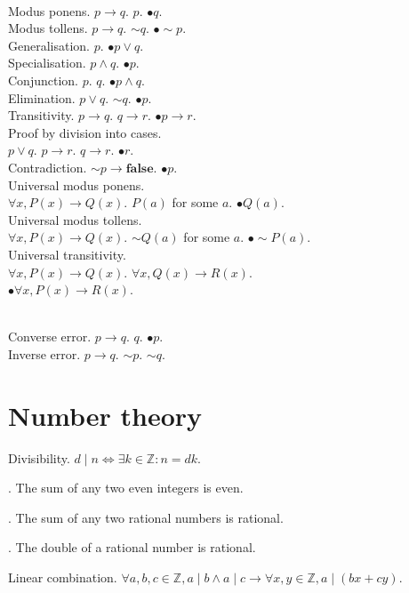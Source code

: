 \documentclass{slnotes}
\newcommand{\slnot}{\mathop{\sim}}
\begin{document}
\\
Modus ponens. \(p \to q\). \(p\). \(\bullet q\).\\
Modus tollens. \(p \to q\). \(\slnot q\). \(\bullet \slnot p\).\\
Generalisation. \(p\). \(\bullet p \lor q\).\\
Specialisation. \(p \land q\). \(\bullet p\).\\
Conjunction. \(p\). \(q\). \(\bullet p \land q\).\\
Elimination. \(p \lor q\). \(\slnot q\). \(\bullet p\).\\
Transitivity. \(p \to q\). \(q \to r\). \(\bullet p \to r\).\\
Proof by division into cases.\\\(p \lor q\). \(p \to r\). \(q \to r\). \(\bullet r\).\\
Contradiction. \(\slnot p \to \mathbf{false}\). \(\bullet p\).\\
Universal modus ponens.\\\(\forall x, P(x) \to Q(x)\). \(P(a)\) for some \(a\). \(\bullet Q(a)\).\\
Universal modus tollens.\\\(\forall x, P(x) \to Q(x)\). \(\slnot Q(a)\) for some \(a\). \(\bullet \slnot P(a)\).\\
Universal transitivity.\\\(\forall x, P(x) \to Q(x)\). \(\forall x, Q(x) \to R(x)\).\\\(\bullet \forall x, P(x) \to R(x)\).

\\
Converse error. \(p \to q\). \(q\). \(\bullet p\).\\
Inverse error. \(p \to q\). \(\slnot p\). \(\slnot q\).

\chapter{Number theory}
 Divisibility. \(d \mid n \Leftrightarrow \exists k \in \mathbb{Z} : n = dk\).

. The sum of any two even integers is even.

. The sum of any two rational numbers is rational.

. The double of a rational number is rational.

 Linear combination. \(\forall a, b, c \in \mathbb{Z}, a \mid b \land a \mid c \to \forall x,y \in \mathbb{Z}, a \mid (bx + cy)\).
\end{document}
